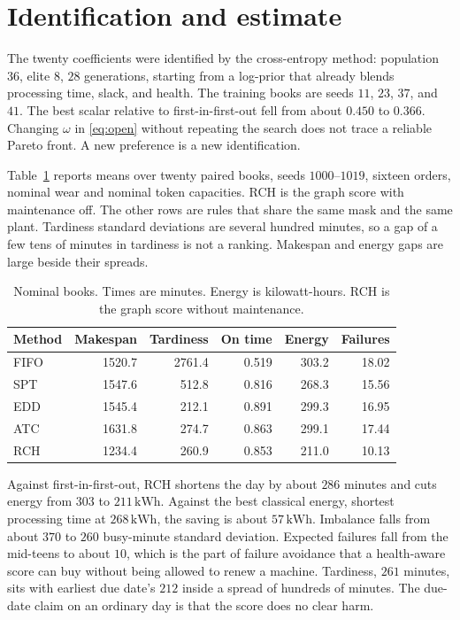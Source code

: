 \documentclass[10pt,a4paper]{article}
\begin{document}
\section{Identification and estimate}

The twenty coefficients were identified by the cross-entropy method: population \(36\), elite \(8\), \(28\) generations, starting from a log-prior that already blends processing time, slack, and health. The training books are seeds \(11\), \(23\), \(37\), and \(41\). The best scalar relative to first-in-first-out fell from about \(0.450\) to \(0.366\). Changing \(\omega\) in \eqref{eq:open} without repeating the search does not trace a reliable Pareto front. A new preference is a new identification.

Table~\ref{tab:nominal} reports means over twenty paired books, seeds \(1000\)--\(1019\), sixteen orders, nominal wear and nominal token capacities. RCH is the graph score with maintenance off. The other rows are rules that share the same mask and the same plant. Tardiness standard deviations are several hundred minutes, so a gap of a few tens of minutes in tardiness is not a ranking. Makespan and energy gaps are large beside their spreads.

\begin{table}[ht]
\centering
\caption{Nominal books. Times are minutes. Energy is kilowatt-hours. RCH is the graph score without maintenance.}
\label{tab:nominal}
\small
\begin{tabular}{lrrrrr}
\toprule
Method & Makespan & Tardiness & On time & Energy & Failures \\
\midrule
FIFO & 1520.7 & 2761.4 & 0.519 & 303.2 & 18.02 \\
SPT & 1547.6 & 512.8 & 0.816 & 268.3 & 15.56 \\
EDD & 1545.4 & 212.1 & 0.891 & 299.3 & 16.95 \\
ATC & 1631.8 & 274.7 & 0.863 & 299.1 & 17.44 \\
RCH & 1234.4 & 260.9 & 0.853 & 211.0 & 10.13 \\
\bottomrule
\end{tabular}
\end{table}

Against first-in-first-out, RCH shortens the day by about \(286\) minutes and cuts energy from \(303\) to \(211\,\mathrm{kWh}\). Against the best classical energy, shortest processing time at \(268\,\mathrm{kWh}\), the saving is about \(57\,\mathrm{kWh}\). Imbalance falls from about \(370\) to \(260\) busy-minute standard deviation. Expected failures fall from the mid-teens to about \(10\), which is the part of failure avoidance that a health-aware score can buy without being allowed to renew a machine. Tardiness, \(261\) minutes, sits with earliest due date's \(212\) inside a spread of hundreds of minutes. The due-date claim on an ordinary day is that the score does no clear harm.
\end{document}

